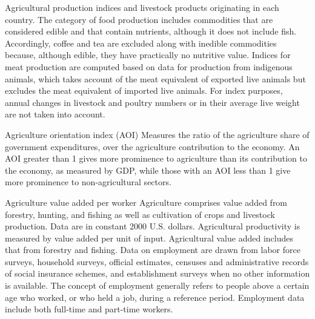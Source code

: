 \begin{MetadataCollection} {}
\begin{metadata}{Agricultural production indices} {}
and livestock products originating in each country. The category of food production includes commodities that are considered edible and that contain nutrients, although it does not include fish. Accordingly, coffee and tea are excluded along with inedible commodities because, although edible, they have practically no nutritive value. Indices for meat production are computed based on data for production from indigenous animals, which takes account of the meat equivalent of exported live animals but excludes the meat equivalent of imported live animals. For index purposes, annual changes in livestock and poultry numbers or in their average live weight are not taken into account.
\end{metadata}

\begin{metadata}{Agriculture orientation index (AOI)} {}
Measures the ratio of the agriculture share of government expenditures, over the agriculture contribution to the economy. An AOI greater than 1 gives more prominence to agriculture than its contribution to the economy, as measured by GDP, while those with an AOI less than 1 give more prominence to non-agricultural sectors.
\end{metadata}

\begin{metadata}{Agriculture value added per worker} {}
Agriculture comprises value added from forestry, hunting, and fishing as well as cultivation of crops and livestock production. Data are in constant 2000 U.S. dollars. Agricultural productivity is measured by value added per unit of input. Agricultural value added includes that from forestry and fishing. Data on employment are drawn from labor force surveys, household surveys, official estimates, censuses and administrative records of social insurance schemes, and establishment surveys when no other information is available. The concept of employment generally refers to people above a certain age who worked, or who held a job, during a reference period. Employment data include both full-time and part-time workers.
\end{metadata}



\end{MetadataCollection}
